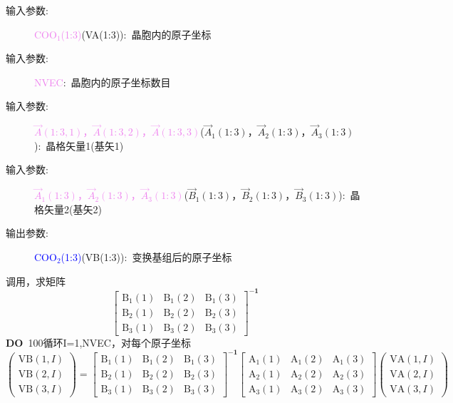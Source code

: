 \documentclass{article}      %
\begin{document}
\vskip 30pt
\begin{description}
	\item[输入参数:~] \textcolor{violet}{$\mathrm{COO}_1$(1:3)}(\textrm{VA(1:3)}):~晶胞内的原子坐标
	\item[输入参数:~] \textcolor{violet}{\textrm{NVEC}}:~晶胞内的原子坐标数目
	\item[输入参数:~] \textcolor{violet}{$\vec A(1:3,1)$，$\vec A(1:3,2)$，$\vec A(1:3,3)$}($\vec A_1(1:3)$，$\vec A_2(1:3)$，$\vec A_3(1:3)$):~晶格矢量1(基矢1)
	\item[输入参数:~] \textcolor{violet}{$\vec A_1(1:3)$，$\vec A_2(1:3)$，$\vec A_3(1:3)$}($\vec B_1(1:3)$，$\vec B_2(1:3)$，$\vec B_3(1:3)$):~晶格矢量2(基矢2)
	\item[输出参数:~] \textcolor{blue}{$\mathrm{COO}_2$(1:3)}(\textrm{VB(1:3)}):~变换基组后的原子坐标
\end{description}
调用，求矩阵
\begin{displaymath}
	\begin{bmatrix}
		\mathrm{B}_1(1) & \mathrm{B}_1(2) & \mathrm{B}_1(3)\\
		\mathrm{B}_2(1) & \mathrm{B}_2(2) & \mathrm{B}_2(3)\\
		\mathrm{B}_3(1) & \mathrm{B}_3(2) & \mathrm{B}_3(3)
	\end{bmatrix}^{\mathbf{-1}}
\end{displaymath}
\textbf{DO}~100循环\textrm{I}=1,\textrm{NVEC}，对每个原子坐标
\begin{displaymath}
	\begin{pmatrix}
		\mathrm{VB}(1,I)\\\mathrm{VB}(2,I)\\\mathrm{VB}(3,I)
	\end{pmatrix}=
	\begin{bmatrix}
		\mathrm{B}_1(1) & \mathrm{B}_1(2) & \mathrm{B}_1(3)\\
		\mathrm{B}_2(1) & \mathrm{B}_2(2) & \mathrm{B}_2(3)\\
		\mathrm{B}_3(1) & \mathrm{B}_3(2) & \mathrm{B}_3(3)
	\end{bmatrix}^{\mathbf{-1}}
	\begin{bmatrix}
		\mathrm{A}_1(1) & \mathrm{A}_1(2) & \mathrm{A}_1(3)\\
		\mathrm{A}_2(1) & \mathrm{A}_2(2) & \mathrm{A}_2(3)\\
		\mathrm{A}_3(1) & \mathrm{A}_3(2) & \mathrm{A}_3(3)
	\end{bmatrix}
	\begin{pmatrix}
		\mathrm{VA}(1,I)\\\mathrm{VA}(2,I)\\\mathrm{VA}(3,I)
	\end{pmatrix}
\end{displaymath}
\end{document}
